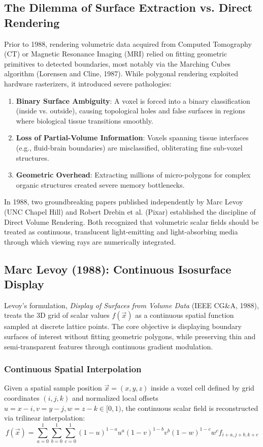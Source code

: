 \documentclass[10pt,twocolumn,a4paper]{article}
\begin{document}
\subsection{The Dilemma of Surface Extraction vs. Direct Rendering}
Prior to 1988, rendering volumetric data acquired from Computed Tomography (CT) or Magnetic Resonance Imaging (MRI) relied on fitting geometric primitives to detected boundaries, most notably via the Marching Cubes algorithm (Lorensen and Cline, 1987). While polygonal rendering exploited hardware rasterizers, it introduced severe pathologies:
\begin{enumerate}
    \item \textbf{Binary Surface Ambiguity}: A voxel is forced into a binary classification (inside vs. outside), causing topological holes and false surfaces in regions where biological tissue transitions smoothly.
    \item \textbf{Loss of Partial-Volume Information}: Voxels spanning tissue interfaces (e.g., fluid-brain boundaries) are misclassified, obliterating fine sub-voxel structures.
    \item \textbf{Geometric Overhead}: Extracting millions of micro-polygons for complex organic structures created severe memory bottlenecks.
\end{enumerate}

In 1988, two groundbreaking papers published independently by Marc Levoy (UNC Chapel Hill) and Robert Drebin et al. (Pixar) established the discipline of Direct Volume Rendering. Both recognized that volumetric scalar fields should be treated as continuous, translucent light-emitting and light-absorbing media through which viewing rays are numerically integrated.

\subsection{Marc Levoy (1988): Continuous Isosurface Display}
Levoy's formulation, \textit{Display of Surfaces from Volume Data} (IEEE CG\&A, 1988), treats the 3D grid of scalar values $f(\vec{x})$ as a continuous spatial function sampled at discrete lattice points. The core objective is displaying boundary surfaces of interest without fitting geometric polygons, while preserving thin and semi-transparent features through continuous gradient modulation.

\subsubsection{Continuous Spatial Interpolation}
Given a spatial sample position $\vec{x} = (x, y, z)$ inside a voxel cell defined by grid coordinates $(i, j, k)$ and normalized local offsets $u = x - i, v = y - j, w = z - k \in [0, 1)$, the continuous scalar field is reconstructed via trilinear interpolation:
\begin{equation}
f(\vec{x}) = \sum_{a=0}^{1} \sum_{b=0}^{1} \sum_{c=0}^{1} (1-u)^{1-a} u^a (1-v)^{1-b} v^b (1-w)^{1-c} w^c f_{i+a, j+b, k+c}
\end{equation}
\end{document}
